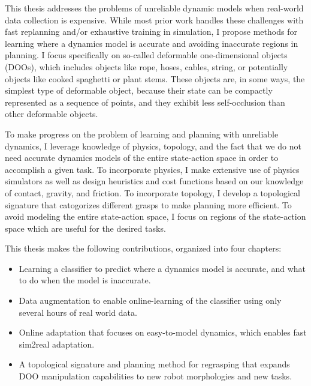 This thesis addresses the problems of unreliable dynamic models when real-world data collection is expensive. While most prior work handles these challenges with fast replanning and/or exhaustive training in simulation, I propose methods for learning where a dynamics model is accurate and avoiding inaccurate regions in planning. I focus specifically on so-called deformable one-dimensional objects (DOOs), which includes objects like rope, hoses, cables, string, or potentially objects like cooked spaghetti or plant stems. These objects are, in some ways, the simplest type of deformable object, because their state can be compactly represented as a sequence of points, and they exhibit less self-occlusion than other deformable objects.

To make progress on the problem of learning and planning with unreliable dynamics, I leverage knowledge of physics, topology, and the fact that we do not need accurate dynamics models of the entire state-action space in order to accomplish a given task. To incorporate physics, I make extensive use of physics simulators as well as design heuristics and cost functions based on our knowledge of contact, gravity, and friction. To incorporate topology, I develop a topological signature that catogorizes different grasps to make planning more efficient. To avoid modeling the entire state-action space, I focus on regions of the state-action space which are useful for the desired tasks.

This thesis makes the following contributions, organized into four chapters:

\begin{itemize}
    \item Learning a classifier to predict where a dynamics model is accurate, and what to do when the model is inaccurate.
    \item Data augmentation to enable online-learning of the classifier using only several hours of real world data.
    \item Online adaptation that focuses on easy-to-model dynamics, which enables fast sim2real adaptation.
    \item A topological signature and planning method for regrasping that expands DOO manipulation capabilities to new robot morphologies and new tasks.
\end{itemize}
